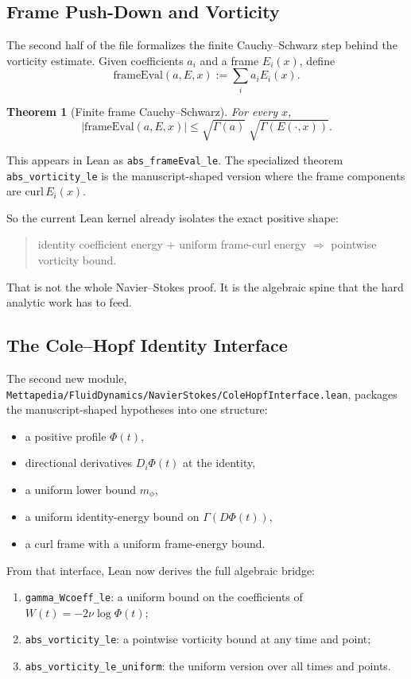 \documentclass[11pt]{article}
\newtheorem{theorem}{Theorem}[section]
\theoremstyle{remark}
\begin{document}
\subsection{Frame Push-Down and Vorticity}

The second half of the file formalizes the finite Cauchy--Schwarz step behind
the vorticity estimate.  Given coefficients \(a_i\) and a frame \(E_i(x)\), define
\[
  \mathrm{frameEval}(a,E,x) := \sum_i a_i E_i(x).
\]

\begin{theorem}[Finite frame Cauchy--Schwarz]
For every \(x\),
\[
  |\mathrm{frameEval}(a,E,x)|
  \le \sqrt{\Gamma(a)}\;\sqrt{\Gamma(E(\cdot,x))}.
\]
\end{theorem}

\noindent
This appears in Lean as \texttt{abs\_frameEval\_le}.  The specialized theorem
\texttt{abs\_vorticity\_le} is the manuscript-shaped version where the frame
components are \(\mathrm{curl}\,E_i(x)\).

So the current Lean kernel already isolates the exact positive shape:
\begin{quote}
identity coefficient energy + uniform frame-curl energy
\(\Longrightarrow\) pointwise vorticity bound.
\end{quote}

That is not the whole Navier--Stokes proof.  It is the algebraic spine that the
hard analytic work has to feed.

\subsection{The Cole--Hopf Identity Interface}

The second new module,
\texttt{Mettapedia/FluidDynamics/NavierStokes/ColeHopfInterface.lean},
packages the manuscript-shaped hypotheses into one structure:
\begin{itemize}[leftmargin=1.5em]
  \item a positive profile \(\Phi(t)\),
  \item directional derivatives \(D_i\Phi(t)\) at the identity,
  \item a uniform lower bound \(m_\phi\),
  \item a uniform identity-energy bound on \(\Gamma(D\Phi(t))\),
  \item a curl frame with a uniform frame-energy bound.
\end{itemize}

From that interface, Lean now derives the full algebraic bridge:
\begin{enumerate}[leftmargin=1.5em]
  \item \texttt{gamma\_Wcoeff\_le}: a uniform bound on the coefficients of
  \(W(t) = -2\nu\log\Phi(t)\);
  \item \texttt{abs\_vorticity\_le}: a pointwise vorticity bound at any time and
  point;
  \item \texttt{abs\_vorticity\_le\_uniform}: the uniform version over all times
  and points.
\end{enumerate}
\end{document}
